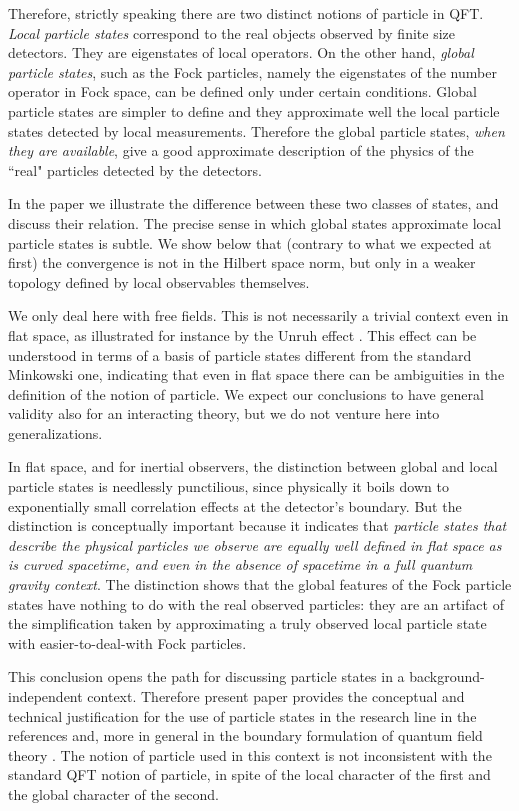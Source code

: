 \documentclass[11pt, nofootinbib]{revtex4-2}
\begin{document}
Therefore, strictly speaking there are two distinct notions of
particle in QFT. \emph{Local particle states} correspond to the real
objects observed by finite size detectors.  They are eigenstates of
local operators. On the other hand,  \emph{global particle states}, 
such as the Fock particles, namely the eigenstates of the number 
operator in Fock space, can be defined only under certain conditions.  
Global particle states are simpler to define and they approximate well 
the local particle states detected by local measurements.  Therefore 
the global particle states, {\em when they are available}, give a good
approximate description of the physics of the ``real" particles detected
by the detectors. 

In the paper we illustrate the difference between these two classes of
states, and discuss their relation.  The precise sense in which global
states approximate local particle states is subtle.  We show below
that (contrary to what we expected at first) the convergence is not in
the Hilbert space norm, but only in a weaker topology defined by local
observables themselves.

We only deal here with free fields.  This is not necessarily a trivial
context even in flat space, as illustrated for instance by the Unruh
effect \cite{Unruh:db}.  This effect can be understood in terms of a
basis of particle states different from the standard Minkowski one,
indicating that even in flat space there can be ambiguities in the
definition of the notion of particle.  We expect our conclusions to
have general validity also for an interacting theory, but we do not 
venture here into generalizations. 

In flat space, and for inertial observers, the distinction between
global and local particle states is needlessly punctilious, since
physically it boils down to exponentially small correlation effects at
the detector's boundary.  But the distinction is conceptually
important because it indicates that {\em particle states that
describe the physical particles we observe are equally well 
defined in flat space as is curved spacetime, and even in the 
absence of spacetime in a full quantum gravity context}.  
The distinction shows that the global features of the Fock particle 
states have nothing to do with the real observed particles: they 
are an artifact of the simplification taken by approximating a 
truly observed local particle state with easier-to-deal-with 
Fock particles.

This conclusion opens the path
for discussing particle states in a background-independent context.  
Therefore present paper provides the conceptual and technical 
justification for the use of particle states in the research line in the
references \cite{transitions} and, more in general in the boundary 
formulation of quantum field theory \cite{boundary,book}.  The notion of 
particle used in this context is  not 
inconsistent with the standard QFT notion of particle, in spite of 
the local character of the first and the global character of the second.   
\end{document}
